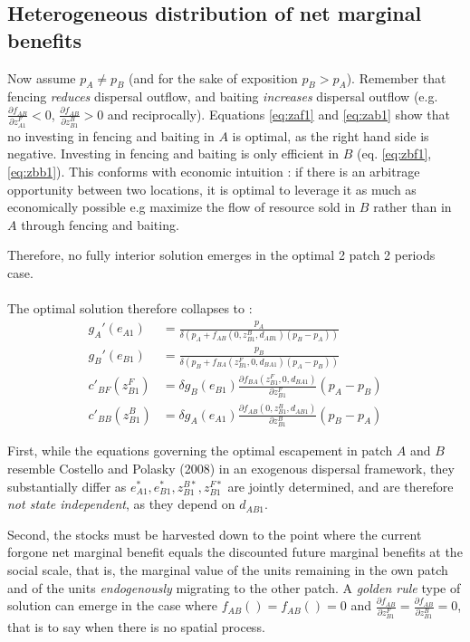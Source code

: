 \documentclass{article}
\begin{document}
\subsection{Heterogeneous distribution of net marginal benefits }

Now assume $p_A \neq p_B$ (and for the sake of exposition $p_B > p_A$). Remember that fencing \textit{reduces} dispersal outflow, and baiting \textit{increases} dispersal outflow (e.g. $\frac{\partial f_{AB}}{\partial z_{A1}^F}<0$, $\frac{\partial f_{AB}}{\partial z_{B1}^B}>0$ and reciprocally). Equations \ref{eq:zaf1} and \ref{eq:zab1} show that no investing  in fencing and baiting in $A$ is optimal, as the right hand side is negative. Investing in fencing and baiting is only efficient in $B$ (eq. \ref{eq:zbf1}, \ref{eq:zbb1}). This conforms with economic intuition : if there is an arbitrage opportunity between two locations, it is optimal to leverage it as much as economically possible e.g maximize the flow of resource sold in $B$ rather than in $A$ through fencing and baiting. 

Therefore, no fully interior solution emerges in the optimal 2 patch 2 periods case. \\\\

The optimal solution therefore collapses to : 
\begin{align*}
g_A'(e_{A1}) &= \frac{p_A}{\delta \left(p_A + f_{AB}(0, z_{B1}^B, d_{AB1})(p_B-p_A)\right)} \\
%
g_B'(e_{B1}) &= \frac{p_B}{\delta \left( p_B + f_{BA}(z_{B1}^F, 0, d_{BA1})(p_A-p_B)\right)} \\
%
c'_{BF}(z_{B1}^F) &= \delta g_B(e_{B1}) \frac{\partial f_{BA}(z_{B1}^F, 0, d_{BA1})}{\partial z_{B1}^F}(p_A - p_B)\\
%
c'_{BB}(z_{B1}^B) & = \delta g_A(e_{A1}) \frac{\partial f_{AB}(0, z_{B1}^B, d_{AB1})}{\partial z_{B1}^B}(p_{B} - p_{A})
\end{align*}

First, while the equations governing the optimal escapement in patch $A$ and $B$ resemble Costello and Polasky (2008) in an exogenous dispersal framework, they substantially differ as $e_{A1}^*, e_{B1}^*, z_{B1}^{B*}, z_{B1}^{F*}$ are jointly determined, and are therefore \textit{not state independent}, as they depend on $d_{AB1}$.

Second, the stocks must be harvested down to the point where the current forgone net marginal benefit equals the discounted future marginal benefits at the social scale, that is, the marginal value of the units remaining in the own patch and of the units \textit{endogenously} migrating to the other patch. A \textit{golden rule} type of solution can emerge in the case where $f_{AB}()= f_{AB}()=0$ and $\frac{\partial f_{AB}}{\partial z_{B1}^F} = \frac{\partial f_{AB}}{\partial z_{B1}^B}=0$, that is to say when there is no spatial process.
\end{document}
